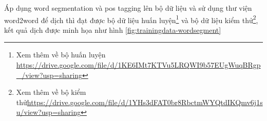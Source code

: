 \begin{table}[H]
\begin{center}

\end{center}
\caption{Danh sách cách POS tags phổ biến}
    \label{fig:Part-Of-Speech (POS) tags}
\end{table}

Áp dụng word segmentation và pos tagging lên bộ dữ liệu và sử dụng thư viện word2word để dịch thì đạt được bộ dữ liệu huấn luyện\footnote{Xem thêm về bộ huấn luyện \url{https://drive.google.com/file/d/1KE6IMt7KTVu5LRQWI9b57EUgWuqBRgp_/view?usp=sharing}} và bộ dữ liệu kiểm thử\footnote{Xem thêm về bộ kiểm thử\url{https://drive.google.com/file/d/1YHs3dFAT0br8RbctmWYQtdIKQmv6j1su/view?usp=sharing}}, kết quả dịch được minh họa như hình \ref{fig:trainingdata-wordsegment}


